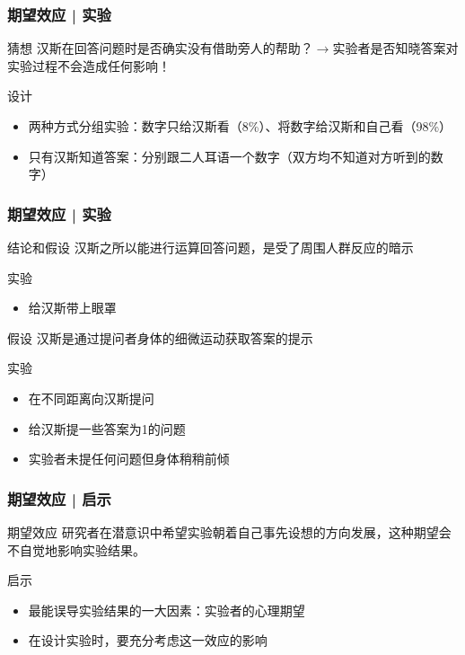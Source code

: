 \begin{frame}
  \frametitle{期望效应 | 实验}
  \begin{block}{猜想}
    汉斯在回答问题时是否确实没有借助旁人的帮助？$\longrightarrow$实验者是否知晓答案对实验过程不会造成任何影响！
  \end{block}
  \pause
  \begin{block}{设计}
    \begin{itemize}
      \item 两种方式分组实验：数字只给汉斯看（8\%）、将数字给汉斯和自己看（98\%）
      \item 只有汉斯知道答案：分别跟二人耳语一个数字（双方均不知道对方听到的数字）
    \end{itemize}
  \end{block}
\end{frame}

\begin{frame}
  \frametitle{期望效应 | 实验}
  \begin{block}{结论和假设}
    汉斯之所以能进行运算回答问题，是受了周围人群反应的暗示
  \end{block}
  \pause
  \begin{block}{实验}
    \begin{itemize}
      \item 给汉斯带上眼罩
    \end{itemize}
  \end{block}
  \pause
  \begin{block}{假设}
    汉斯是通过提问者身体的细微运动获取答案的提示
  \end{block}
  \pause
  \begin{block}{实验}
    \begin{itemize}
      \item 在不同距离向汉斯提问
      \item 给汉斯提一些答案为1的问题
      \item 实验者未提任何问题但身体稍稍前倾
    \end{itemize}
  \end{block}
\end{frame}

\begin{frame}
  \frametitle{期望效应 | 启示}
  \begin{block}{期望效应}
    研究者在潜意识中希望实验朝着自己事先设想的方向发展，这种期望会不自觉地影响实验结果。
  \end{block}
  \pause
  \begin{block}{启示}
    \begin{itemize}
      \item 最能误导实验结果的一大因素：实验者的心理期望
      \item 在设计实验时，要充分考虑这一效应的影响
    \end{itemize}
  \end{block}
\end{frame}

